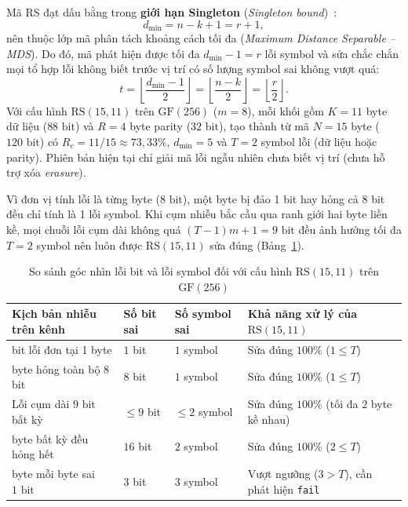 \documentclass[11pt,a4paper]{report}
\begin{document}
Mã RS đạt dấu bằng trong \textbf{giới hạn Singleton} (\textit{Singleton bound})~\cite{lincostello2004}:
\begin{equation}
    d_{\min} = n - k + 1 = r + 1,
    \label{eq:mds-dmin}
\end{equation}
nên thuộc lớp mã phân tách khoảng cách tối đa (\textit{Maximum Distance Separable -- MDS}). Do đó, mã phát hiện được tối đa $d_{\min} - 1 = r$ lỗi symbol và sửa chắc chắn mọi tổ hợp lỗi không biết trước vị trí có số lượng symbol sai không vượt quá:
\begin{equation}
    t = \left\lfloor \frac{d_{\min} - 1}{2} \right\rfloor = \left\lfloor \frac{n - k}{2} \right\rfloor = \left\lfloor \frac{r}{2} \right\rfloor.
    \label{eq:rs-t-cap}
\end{equation}
Với cấu hình $\text{RS}(15,11)$ trên $\text{GF}(256)$ ($m = 8$), mỗi khối gồm $K = 11$ byte dữ liệu ($88\text{ bit}$) và $R = 4$ byte parity ($32\text{ bit}$), tạo thành từ mã $N = 15$ byte ($120\text{ bit}$) có $R_c = 11/15 \approx 73{,}33\%$, $d_{\min} = 5$ và $T = 2$ symbol lỗi (dữ liệu hoặc parity). Phiên bản hiện tại chỉ giải mã lỗi ngẫu nhiên chưa biết vị trí (chưa hỗ trợ xóa \textit{erasure}).

Vì đơn vị tính lỗi là từng byte ($8\text{ bit}$), một byte bị đảo 1 bit hay hỏng cả 8 bit đều chỉ tính là 1 lỗi symbol. Khi cụm nhiễu bắc cầu qua ranh giới hai byte liền kề, mọi chuỗi lỗi cụm dài không quá $(T - 1)m + 1 = 9\text{ bit}$ đều ảnh hưởng tối đa $T = 2$ symbol nên luôn được $\text{RS}(15,11)$ sửa đúng (Bảng~\ref{tab:bit-vs-symbol}).

\begin{table}[!htb]
    \centering
    \caption{So sánh góc nhìn lỗi bit và lỗi symbol đối với cấu hình $\text{RS}(15,11)$ trên $\text{GF}(256)$}
    \label{tab:bit-vs-symbol}
    \footnotesize
    \begin{tabularx}{\textwidth}{@{}>{\raggedright\arraybackslash}p{4.1cm} >{\centering\arraybackslash}p{2.2cm} >{\centering\arraybackslash}p{2.4cm} X@{}}
        \toprule
        \textbf{Kịch bản nhiễu trên kênh} & \textbf{Số bit sai} & \textbf{Số symbol sai} & \textbf{Khả năng xử lý của $\text{RS}(15,11)$} \\
        \midrule
        1 bit lỗi đơn tại 1 byte & $1$ bit & $1$ symbol & Sửa đúng $100\%$ ($1 \le T$) \\
        1 byte hỏng toàn bộ 8 bit & $8$ bit & $1$ symbol & Sửa đúng $100\%$ ($1 \le T$) \\
        Lỗi cụm dài $9\text{ bit}$ bất kỳ & $\le 9$ bit & $\le 2$ symbol & Sửa đúng $100\%$ (tối đa $2$ byte kề nhau) \\
        2 byte bất kỳ đều hỏng hết & $16$ bit & $2$ symbol & Sửa đúng $100\%$ ($2 \le T$) \\
        3 byte mỗi byte sai $1\text{ bit}$ & $3$ bit & $3$ symbol & Vượt ngưỡng ($3 > T$), cần phát hiện \texttt{fail} \\
        \bottomrule
    \end{tabularx}
\end{table}
\end{document}
